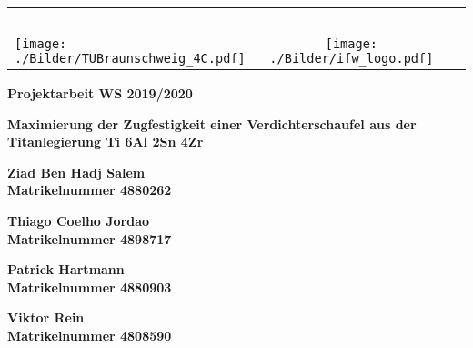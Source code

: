 \begin{titlepage}
 \centering

\begin{table}[htbp]
 \begin{center}
 \vspace{-0.5cm}
  \begin{tabular}{lcr} 
    \parbox{0.45\textwidth}{\mbox{ }} & \parbox{0.13\textwidth}{\mbox{ }} & \parbox{0.45\textwidth}{\mbox{ }} \\
    \hspace*{-2.0cm}
    \texttt{[image: ./Bilder/TUBraunschweig\_4C.pdf]} &		 					\texttt{[image: ./Bilder/ifw\_logo.pdf]} 
       \\ %
  \end{tabular}
 \end{center}
\end{table}


 \vspace*{2.0cm}

 \textbf{\large Projektarbeit WS 2019/2020}


 \vspace*{1.5cm}
 
 \textbf{\LARGE  Maximierung der Zugfestigkeit einer Verdichterschaufel aus der Titanlegierung Ti 6Al 2Sn 4Zr} \\[0.5ex]


 \vspace*{1.5cm}

 \textbf{\large Ziad Ben Hadj Salem} \\[0.5ex]
 \textbf{Matrikelnummer 4880262}
 
 \textbf{\large Thiago Coelho Jordao} \\[0.5ex]
 \textbf{Matrikelnummer 4898717}
 
 \textbf{\large Patrick Hartmann} \\[0.5ex]
 \textbf{Matrikelnummer 4880903}

 \textbf{\large Viktor Rein} \\[0.5ex]
 \textbf{Matrikelnummer 4808590}
 

 

 



 \vspace*{2.5cm}


\end{titlepage}
